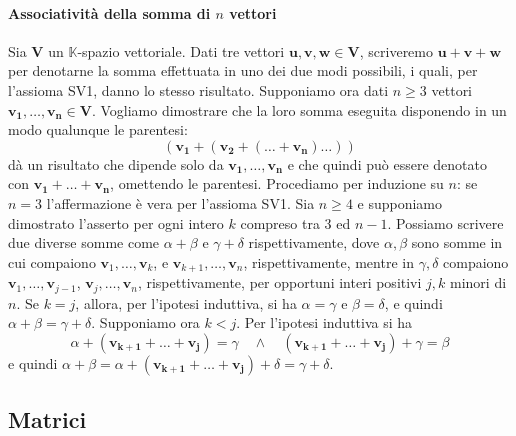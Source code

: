 \documentclass{article}
\theoremstyle{plain}
\theoremstyle{definition}
\theoremstyle{remark}
\begin{document}
\vspace{10pt}

\paragraph{Associatività della somma di $n$ vettori}
Sia \( \mathbf{V} \) un \( \mathbb{K} \)-spazio vettoriale. Dati tre vettori \( \mathbf{u}, \mathbf{v}, \mathbf{w} \in \mathbf{V} \), scriveremo \( \mathbf{u} + \mathbf{v} + \mathbf{w} \) per denotarne la somma effettuata in uno dei due modi possibili, i quali, per l'assioma SV1, danno lo stesso risultato.
Supponiamo ora dati \( n \geq 3 \) vettori \( \mathbf{v_1}, \ldots, \mathbf{v_n} \in \mathbf{V} \). 
Vogliamo dimostrare che la loro somma eseguita disponendo in un modo qualunque le parentesi:
\[ (\mathbf{v_1} + (\mathbf{v_2} + ( \ldots + \mathbf{v_n}) \ldots ))\]
dà un risultato che dipende solo da \( \mathbf{v_1}, \ldots, \mathbf{v_n} \) e che quindi può essere denotato con \( \mathbf{v_1} + \ldots + \mathbf{v_n} \), omettendo le parentesi.
Procediamo per induzione su \( n \): se \( n = 3 \) l'affermazione è vera per l'assioma SV1.
Sia \( n \geq 4 \) e supponiamo dimostrato l'asserto per ogni intero \( k \) compreso tra $3$ ed \( n - 1 \).
Possiamo scrivere due diverse somme come \( \alpha + \beta \) e \( \gamma + \delta \) rispettivamente, dove \( \alpha, \beta \) sono somme in cui compaiono \( \mathbf{v}_1, \ldots, \mathbf{v}_k \), e \( \mathbf{v}_{k+1}, \ldots, \mathbf{v}_n \), rispettivamente, mentre in \( \gamma, \delta \) compaiono \( \mathbf{v}_1, \ldots, \mathbf{v}_{j-1} \), \( \mathbf{v}_j, \ldots, \mathbf{v}_n \), rispettivamente, per opportuni interi positivi \( j, k \) minori di \( n \).
Se \( k = j \), allora, per l'ipotesi induttiva, si ha \( \alpha = \gamma \) e \( \beta = \delta \), e quindi \( \alpha + \beta = \gamma + \delta \).
Supponiamo ora \( k < j \). Per l'ipotesi induttiva si ha
\[ \alpha + (\mathbf{v_{k+1}} + \ldots + \mathbf{v_j}) = \gamma\quad\land\quad (\mathbf{v_{k+1}} + \ldots + \mathbf{v_j}) +\gamma = \beta \]
e quindi 
\( \alpha + \beta = \alpha + (\mathbf{v_{k+1}} + \ldots + \mathbf{v_j}) + \delta = \gamma + \delta \).

\vspace{50pt}
\subsection{Matrici}
\vspace{20pt}
\end{document}
